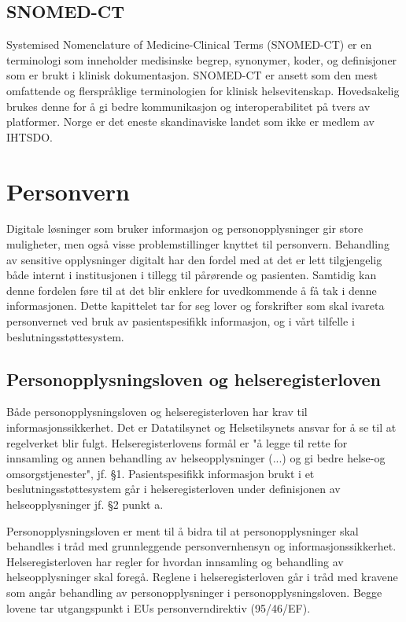 \subsection{SNOMED-CT}
Systemised Nomenclature of Medicine-Clinical Terms (SNOMED-CT) er en terminologi som inneholder medisinske begrep, synonymer, koder, og definisjoner som er brukt i klinisk dokumentasjon. SNOMED-CT er ansett som den mest omfattende og flerspråklige terminologien for klinisk helsevitenskap\citep{Health_interoptability_HL7_SNOMED}. Hovedsakelig brukes denne for å gi bedre kommunikasjon og interoperabilitet på tvers av platformer. Norge er det eneste skandinaviske landet som ikke er medlem av IHTSDO.

\section{Personvern}\label{Personvern}
Digitale løsninger som bruker informasjon og personopplysninger gir store muligheter, men også visse problemstillinger knyttet til personvern. Behandling av sensitive opplysninger digitalt har den fordel med at det er lett tilgjengelig både internt i institusjonen i tillegg til pårørende og pasienten. Samtidig kan denne fordelen føre til at det blir enklere for uvedkommende å få tak i denne informasjonen. Dette kapittelet tar for seg lover og forskrifter som skal ivareta personvernet ved bruk av pasientspesifikk informasjon, og i vårt tilfelle i beslutningsstøttesystem.
\subsection{Personopplysningsloven og helseregisterloven}
Både personopplysningsloven og helseregisterloven har krav til informasjonssikkerhet. Det er Datatilsynet og Helsetilsynets ansvar for å se til at regelverket blir fulgt. Helseregisterlovens formål er "å legge til rette for innsamling og annen behandling av helseopplysninger (...) og gi bedre helse-og omsorgstjenester", jf. §1. Pasientspesifikk informasjon brukt i et beslutningsstøttesystem går i helseregisterloven under definisjonen av helseopplysninger jf. §2 punkt a. 

Personopplysningsloven er ment til å bidra til at personopplysninger skal behandles i tråd med grunnleggende personvernhensyn og informasjonssikkerhet. Helseregisterloven har regler for hvordan innsamling og behandling av helseopplysninger skal foregå. Reglene i helseregisterloven går i tråd med kravene som angår behandling av personopplysninger i personopplysningsloven. Begge lovene tar utgangspunkt i EUs personverndirektiv (95/46/EF).          

